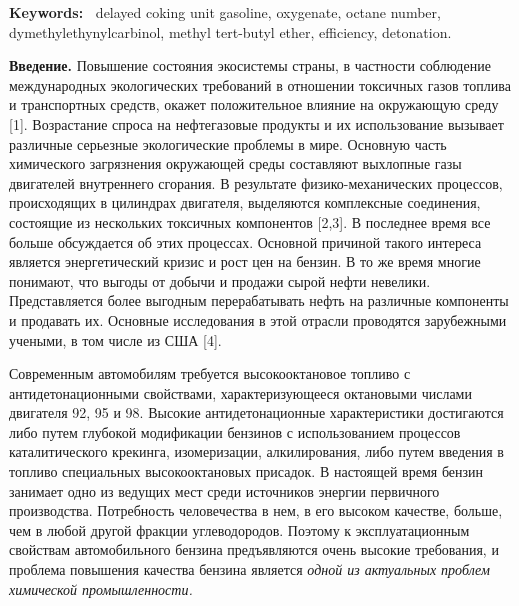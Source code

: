 {\bfseries Keywords:~} delayed coking unit gasoline, oxygenate, octane
number, dymethylethynylcarbinol, methyl tert-butyl ether, efficiency,
detonation.

\begin{multicols}{2}
{\bfseries Введение.} Повышение состояния экосистемы страны, в частности
соблюдение международных экологических требований в отношении токсичных
газов топлива и транспортных средств, окажет положительное влияние на
окружающую среду {[}1{]}. Возрастание спроса на нефтегазовые продукты и
их использование вызывает различные серьезные экологические проблемы в
мире. Основную часть химического загрязнения окружающей среды составляют
выхлопные газы двигателей внутреннего сгорания. В результате
физико-механических процессов, происходящих в цилиндрах двигателя,
выделяются комплексные соединения, состоящие из нескольких токсичных
компонентов {[}2,3{]}. В последнее время все больше обсуждается об этих
процессах. Основной причиной такого интереса является энергетический
кризис и рост цен на бензин. В то же время многие понимают, что выгоды
от добычи и продажи сырой нефти невелики. Представляется более выгодным
перерабатывать нефть на различные компоненты и продавать их. Основные
исследования в этой отрасли проводятся зарубежными учеными, в том числе
из США {[}4{]}.

Современным автомобилям требуется высокооктановое топливо с
антидетонационными свойствами, характеризующееся октановыми числами
двигателя 92, 95 и 98. Высокие антидетонационные характеристики
достигаются либо путем глубокой модификации бензинов с использованием
процессов каталитического крекинга, изомеризации, алкилирования, либо
путем введения в топливо специальных высокооктановых присадок. В
настоящей время бензин занимает одно из ведущих мест среди источников
энергии первичного производства. Потребность человечества в нем, в его
высоком качестве, больше, чем в любой другой фракции углеводородов.
Поэтому к эксплуатационным свойствам автомобильного бензина
предъявляются очень высокие требования, и проблема повышения качества
бензина является \emph{одной из актуальных проблем химической
промышленности.}


\end{multicols}
